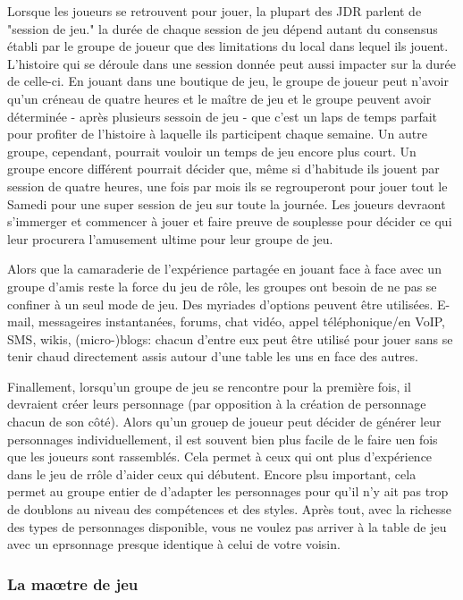 Lorsque les joueurs se retrouvent pour jouer, la plupart des JDR parlent de "session de jeu."  la durée de chaque session de jeu dépend autant du consensus établi par le groupe de joueur que des limitations du local dans lequel ils jouent. L'histoire qui se déroule dans une session donnée peut aussi impacter sur la durée de celle-ci. En jouant dans une boutique de jeu, le groupe de joueur peut n'avoir qu'un créneau de quatre heures et le maître de jeu et le groupe peuvent avoir déterminée - après plusieurs sessoin de jeu - que c'est un laps de temps parfait pour profiter de l'histoire à laquelle ils participent chaque semaine. Un autre groupe, cependant, pourrait vouloir un temps de jeu encore plus court. Un groupe encore différent pourrait décider que, même si d'habitude ils jouent par session de quatre heures, une fois par mois ils se regrouperont pour jouer tout le Samedi pour une super session de jeu sur toute la journée. Les joueurs devraont s'immerger et commencer à jouer et faire preuve de souplesse pour décider ce qui leur procurera l'amusement ultime pour leur groupe de jeu. 

Alors que la camaraderie de l'expérience partagée en jouant face à face avec un groupe d'amis reste la force du jeu de rôle, les groupes ont besoin de ne pas se confiner à un seul mode de jeu. Des myriades d'options peuvent être utilisées. E-mail, messageires instantanées, forums, chat vidéo, appel téléphonique/en VoIP, SMS, wikis, (micro-)blogs: chacun d'entre eux peut être utilisé pour jouer sans se tenir chaud directement assis autour d'une table les uns en face des autres. 

Finallement, lorsqu'un groupe de jeu se rencontre pour la première fois, il devraient créer leurs personnage (par opposition à la création de personnage chacun de son côté). Alors qu'un grouep de joueur peut décider de générer leur personnages individuellement, il est souvent bien plus facile de le faire uen fois que les joueurs sont rassemblés. Cela permet à ceux qui ont plus d'expérience dans le jeu de rrôle d'aider ceux qui débutent. Encore plsu important, cela permet au groupe entier de d'adapter les personnages pour qu'il n'y ait pas trop de doublons au niveau des compétences et des styles. Après tout, avec la richesse des types de personnages disponible, vous ne voulez pas arriver à la table de jeu avec un eprsonnage presque identique à celui de votre voisin. 

\subsubsection{La maœtre de jeu} \label{sec:gamemaster} 

